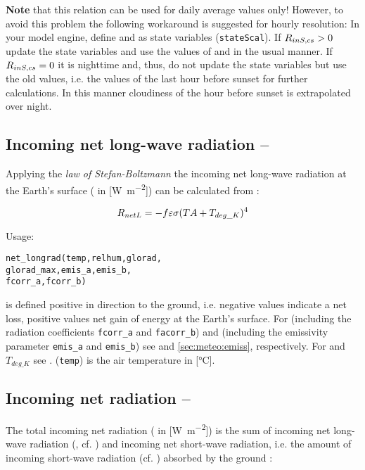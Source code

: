 \textbf{Note} that this relation can be used for daily average values only! However, to avoid this problem the following workaround is suggested for hourly resolution: In your model engine, define \radShortwaveInClearsky{} and \radShortwaveIn{} as state variables (\verb!stateScal!). If $R_{inS,cs}{} > 0$ update the state variables and use the values of \radShortwaveInClearsky{} and \radShortwaveIn{} in the usual manner. If $R_{inS,cs}{} = 0$ it is nighttime and, thus, do not update the state variables but use the old values, i.e. the values of the last hour before sunset for further calculations. In this manner cloudiness of the hour before sunset is extrapolated over night.


\subsection{Incoming net long-wave radiation -- \netRadiationLong} \label{sec:meteo:radnetlong}
Applying the \emph{law of Stefan-Boltzmann} the incoming net long-wave radiation at the Earth's surface (\netRadiationLong{} in [\si{\watt\per\metre\squared}]) can be calculated from \citep{Maidment1993}:

\begin{equation}\label{eqn:meteo:radnetlong}
R_{netL}{} = - f{} \varepsilon{} \sigma{} (TA{} + T_{deg\_K})^4
\end{equation}

\noindent
Usage:
\begin{verbatim}
net_longrad(temp,relhum,glorad,
glorad_max,emis_a,emis_b,
fcorr_a,fcorr_b)
\end{verbatim}

\netRadiationLong{} is defined positive in direction to the ground, i.e. negative values indicate a net loss, positive values net gain of energy at the Earth's surface. For \cloudCorrFac{} (including the radiation coefficients \verb!fcorr_a! and \verb!facorr_b!) and \emissivity{} (including the emissivity parameter \verb!emis_a! and \verb!emis_b!) see  and \ref{sec:meteo:emiss}, respectively. For \stefanBoltzmann{} and $T_{deg\_K}$ see . \airtemp{} (\verb!temp!) is the air temperature in [\si{\degreeCelsius}].


\subsection{Incoming net radiation -- \netRadiation} \label{sec:meteo:radnet}
The total incoming net radiation (\netRadiation{} in [\si{\watt\per\metre\squared}]) is the sum of incoming net long-wave radiation (\netRadiationLong{}, cf. ) and incoming net short-wave radiation, i.e. the amount of incoming short-wave radiation \radShortwaveIn{} (cf. ) absorbed by the ground \citep{Maidment1993}:

